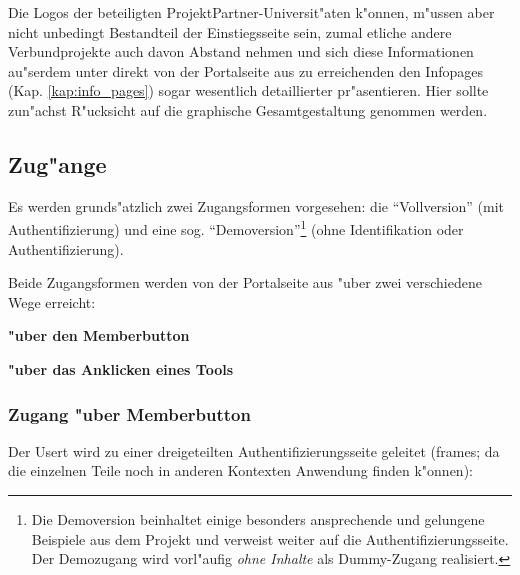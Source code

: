 Die Logos der beteiligten ProjektPartner-Universit"aten k"onnen,
m"ussen aber nicht unbedingt Bestandteil der Einstiegsseite sein,
zumal etliche andere Verbundprojekte auch davon Abstand nehmen und
sich diese Informationen au"serdem unter direkt von der Portalseite
aus zu erreichenden den Infopages (Kap. \ref{kap:info_pages}) sogar
wesentlich detaillierter pr"asentieren. Hier sollte zun"achst
R"ucksicht auf die graphische Gesamtgestaltung genommen werden.


\clearpage


\subsection{Zug"ange}

Es werden grunds"atzlich zwei Zugangsformen vorgesehen: die ``Vollversion''
(mit Authentifizierung) und eine sog. ``Demoversion''\footnote{Die Demoversion
  beinhaltet einige besonders ansprechende und gelungene Beispiele aus dem
  Projekt und verweist weiter auf die Authentifizierungsseite.  Der Demozugang
  wird vorl"aufig \textit{ohne Inhalte} als Dummy-Zugang realisiert.} (ohne
Identifikation oder
Authentifizierung).

Beide Zugangsformen werden von der Portalseite aus "uber zwei verschiedene
Wege erreicht:
\begin{list_sabina}
\item
\textbf{"uber den Memberbutton} 
\item
\textbf{"uber das Anklicken eines Tools} 
\end{list_sabina}


\subsubsection{Zugang "uber Memberbutton}

Der Usert wird zu einer dreigeteilten Authentifizierungsseite geleitet
(frames; da die einzelnen Teile noch in anderen Kontexten Anwendung finden
k"onnen):

